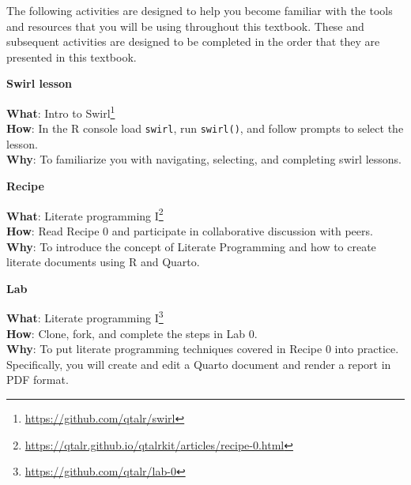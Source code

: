 \documentclass[
  letterpaper,
]{latex/krantz}
\DeclareRobustCommand{\href}[2]{#2\footnote{\url{#1}}}
\begin{document}
The following activities are designed to help you become familiar with
the tools and resources that you will be using throughout this textbook.
These and subsequent activities are designed to be completed in the
order that they are presented in this textbook.

\begin{tcolorbox}[enhanced jigsaw, arc=.35mm, leftrule=.75mm, rightrule=.15mm, opacityback=0, colback=white, breakable, bottomrule=.15mm, left=2mm, toprule=.15mm]

\textbf{ Swirl lesson}

\textbf{What}: \href{https://github.com/qtalr/swirl}{Intro to Swirl}\\
\textbf{How}: In the R console load \texttt{swirl}, run
\texttt{swirl()}, and follow prompts to select the lesson.\\
\textbf{Why}: To familiarize you with navigating, selecting, and
completing swirl lessons.

\end{tcolorbox}

\begin{tcolorbox}[enhanced jigsaw, arc=.35mm, leftrule=.75mm, rightrule=.15mm, opacityback=0, colback=white, breakable, bottomrule=.15mm, left=2mm, toprule=.15mm]

\textbf{ Recipe}

\textbf{What}:
\href{https://qtalr.github.io/qtalrkit/articles/recipe-0.html}{Literate
programming I}\\
\textbf{How}: Read Recipe 0 and participate in collaborative discussion
with peers.\\
\textbf{Why}: To introduce the concept of Literate Programming and how
to create literate documents using R and Quarto.

\end{tcolorbox}

\begin{tcolorbox}[enhanced jigsaw, arc=.35mm, leftrule=.75mm, rightrule=.15mm, opacityback=0, colback=white, breakable, bottomrule=.15mm, left=2mm, toprule=.15mm]

\textbf{ Lab}

\textbf{What}: \href{https://github.com/qtalr/lab-0}{Literate
programming I}\\
\textbf{How}: Clone, fork, and complete the steps in Lab 0.\\
\textbf{Why}: To put literate programming techniques covered in Recipe 0
into practice. Specifically, you will create and edit a Quarto document
and render a report in PDF format.

\end{tcolorbox}
\end{document}
